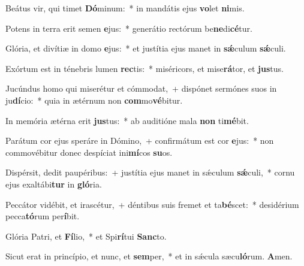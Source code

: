 \item Beátus vir, qui timet \textbf{Dó}minum:~* in mandátis ejus \textbf{vo}let \textbf{ni}mis.

\item Potens in terra erit semen \textbf{e}jus:~* generátio rectórum be\textbf{ne}di\textbf{cé}tur.

\item Glória, et divítiæ in domo \textbf{e}jus:~* et justítia ejus manet in \textbf{sǽ}culum \textbf{sǽ}culi.

\item Exórtum est in ténebris lumen \textbf{rec}tis:~* miséricors, et mise\textbf{rá}tor, et \textbf{jus}tus.

\item Jucúndus homo qui miserétur et cómmodat,~+ dispónet sermónes suos in ju\textbf{dí}cio:~* quia in ætérnum non \textbf{com}mo\textbf{vé}bitur.

\item In memória ætérna erit \textbf{jus}tus:~* ab auditióne mala \textbf{non} ti\textbf{mé}bit.

\item Parátum cor ejus speráre in Dómino,~+ confirmátum est cor \textbf{e}jus:~* non commovébitur donec despíciat ini\textbf{mí}cos \textbf{su}os.

\item Dispérsit, dedit paupéribus:~+ justítia ejus manet in sǽculum \textbf{sǽ}culi,~* cornu ejus exaltábi\textbf{tur} in \textbf{gló}ria.

\item Peccátor vidébit, et irascétur,~+ déntibus suis fremet et ta\textbf{bé}scet:~* desidérium pecca\textbf{tó}rum per\textbf{í}bit.

\item Glória Patri, et \textbf{Fí}lio,~* et Spi\textbf{rí}tui \textbf{Sanc}to.

\item Sicut erat in princípio, et nunc, et \textbf{sem}per,~* et in sǽcula sæcu\textbf{ló}rum. \textbf{A}men.
